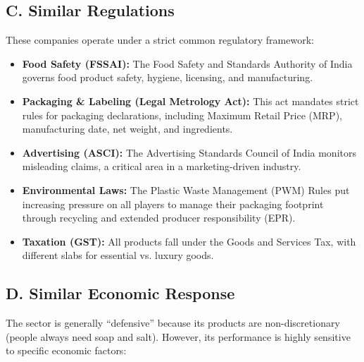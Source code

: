 \documentclass[12pt, a4paper]{report}
\begin{document}
\subsection{C. Similar Regulations}

These companies operate under a strict common regulatory framework:

\begin{itemize}
    \item \textbf{Food Safety (FSSAI):} The Food Safety and Standards Authority of India governs food product safety, hygiene, licensing, and manufacturing.
    
    \item \textbf{Packaging \& Labeling (Legal Metrology Act):} This act mandates strict rules for packaging declarations, including Maximum Retail Price (MRP), manufacturing date, net weight, and ingredients.
    
    \item \textbf{Advertising (ASCI):} The Advertising Standards Council of India monitors misleading claims, a critical area in a marketing-driven industry.
    
    \item \textbf{Environmental Laws:} The Plastic Waste Management (PWM) Rules put increasing pressure on all players to manage their packaging footprint through recycling and extended producer responsibility (EPR).
    
    \item \textbf{Taxation (GST):} All products fall under the Goods and Services Tax, with different slabs for essential vs. luxury goods.
\end{itemize}

\subsection{D. Similar Economic Response}

The sector is generally ``defensive'' because its products are non-discretionary (people always need soap and salt). However, its performance is highly sensitive to specific economic factors:
\end{document}
